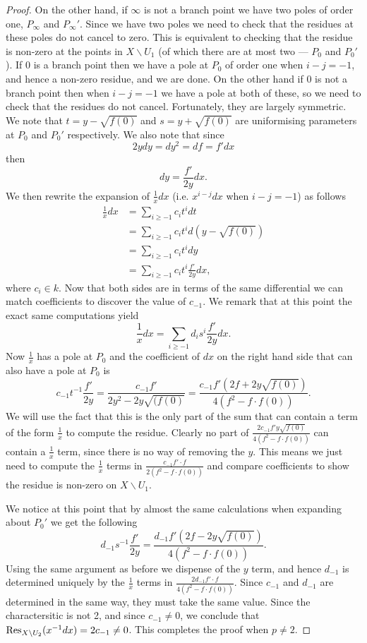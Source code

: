 \begin{proof}
On the other hand, if $\infty$ is not a branch point we have two poles of order one, $P_\infty$ and $P_\infty'$.
Since we have two poles we need to check that the residues at these poles do not cancel to zero.
This is equivalent to checking that the residue is non-zero at the points in $X\backslash U_1$ (of which there are at most two --- $P_0$ and $P_0'$).
If $0$ is a branch point then we have a pole at $P_0$ of order one when $i-j=-1$, and hence a non-zero residue, and we are done.
On the other hand if $0$ is not a branch point then when $i-j=-1$ we have a pole at both of these, so we need to check that the residues do not cancel.
Fortunately, they are largely symmetric.
We note that $t=y-\sqrt{f(0)}$ and $s=y+\sqrt{f(0)}$ are uniformising parameters at $P_0$ and $P_0'$ respectively.
We also note that since
\[
2ydy = dy^2 = df = f'dx
\]
then
\[
dy=\frac{f'}{2y}dx.
\]
We then rewrite the expansion of $\frac{1}{x}dx$ (i.e. $x^{i-j}dx$ when $i-j=-1$) as follows
\begin{align*}
\frac{1}{x}dx & = \sum_{i\geq -1}c_it^i dt \\
& = \sum_{i\geq -1}c_it^i d\left(y-\sqrt{f(0)}\right)\\
& = \sum_{i\geq -1}c_it^i dy \\
& = \sum_{i\geq -1}c_it^i \frac{f'}{2y}dx,
\end{align*}
where $c_i \in k$.
Now that both sides are in terms of the same differential we can match coefficients to discover the value of $c_{-1}$.
We remark that at this point the exact same computations yield
\[
\frac{1}{x}dx = \sum_{i\geq -1}d_is^i \frac{f'}{2y}dx.
\]
Now $\frac{1}{x}$ has a pole at $P_0$ and the coefficient of $dx$ on the right hand side that can also have a pole at $P_0$ is 
\[
c_{-1}t^{-1}\frac{f'}{2y} = \frac{c_{-1}f'}{2y^2 - 2y\sqrt{(f(0)}} = \frac{c_{-1}f'\left( 2f+2y\sqrt{f(0)}\right) }{4(f^2-f\cdot f(0))}.
\]
We will use the fact that this is the only part of the sum that can contain a term of the form $\frac{1}{x}$ to compute the residue.
Clearly no part of $\frac{2c_{-1}f'y\sqrt{f(0)}}{4(f^2-f\cdot f(0))}$ can contain a $\frac{1}{x}$ term, since there is no way of removing the $y$.
This means we just need to compute the $\frac{1}{x}$ terms in $\frac{c_{-1}f'\cdot f}{2(f^2-f\cdot f(0))}$ and compare coefficients to show the residue is non-zero on $X \backslash U_1$.

We notice at this point that by almost the same calculations when expanding about $P_0'$ we get the following
\[
d_{-1}s^{-1}\frac{f'}{2y} = \frac{d_{-1}f'\left(2f-2y\sqrt{f(0)}\right) }{4(f^2 - f\cdot f(0))}.
\]
Using the same argument as before we dispense of the $y$ term, and hence $d_{-1}$ is determined uniquely by the $\frac{1}{x}$ terms in $\frac{2d_{-1}f' \cdot f}{4(f^2-f\cdot f(0))}$.
Since $c_{-1}$ and $d_{-1}$ are determined in the same way, they must take the same value. 
Since the charactersitic is not 2, and since $c_{-1} \neq 0$, we conclude that $\operatorname{Res}_{X\backslash U_2}(x^{-1}dx) = 2c_{-1} \neq 0$.
This completes the proof when $p \neq 2$.


\end{proof}
